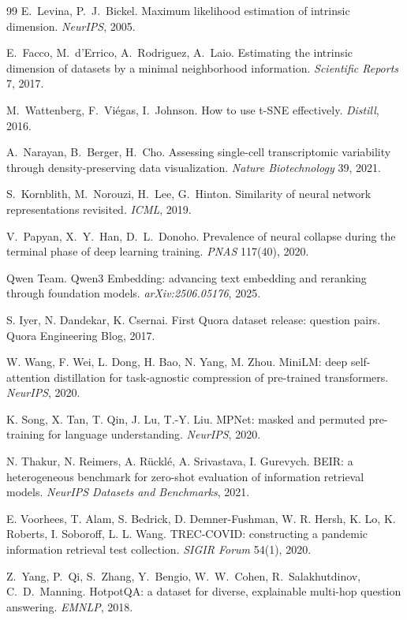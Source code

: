 \documentclass[11pt,letterpaper]{article}
\begin{document}
\begin{thebibliography}{99}
 E.~Levina, P.~J.~Bickel. Maximum likelihood estimation
of intrinsic dimension. \emph{NeurIPS}, 2005.

 E.~Facco, M.~d'Errico, A.~Rodriguez, A.~Laio. Estimating
the intrinsic dimension of datasets by a minimal neighborhood information.
\emph{Scientific Reports} 7, 2017.

 M.~Wattenberg, F.~Vi\'egas, I.~Johnson. How to use
t-SNE effectively. \emph{Distill}, 2016.

 A.~Narayan, B.~Berger, H.~Cho. Assessing single-cell
transcriptomic variability through density-preserving data visualization.
\emph{Nature Biotechnology} 39, 2021.

 S.~Kornblith, M.~Norouzi, H.~Lee, G.~Hinton.
Similarity of neural network representations revisited. \emph{ICML}, 2019.

 V.~Papyan, X.~Y.~Han, D.~L.~Donoho. Prevalence of
neural collapse during the terminal phase of deep learning training.
\emph{PNAS} 117(40), 2020.

 Qwen Team. Qwen3 Embedding: advancing text
embedding and reranking through foundation models.
\emph{arXiv:2506.05176}, 2025.

 S. Iyer, N. Dandekar, K. Csernai. First Quora dataset
release: question pairs. Quora Engineering Blog, 2017.

 W. Wang, F. Wei, L. Dong, H. Bao, N. Yang,
M. Zhou. MiniLM: deep self-attention distillation for task-agnostic
compression of pre-trained transformers. \emph{NeurIPS}, 2020.

 K. Song, X. Tan, T. Qin, J. Lu, T.-Y. Liu. MPNet:
masked and permuted pre-training for language understanding.
\emph{NeurIPS}, 2020.

 N. Thakur, N. Reimers, A. R\"uckl\'e, A. Srivastava,
I. Gurevych. BEIR: a heterogeneous benchmark for zero-shot evaluation of
information retrieval models. \emph{NeurIPS Datasets and Benchmarks}, 2021.

 E. Voorhees, T. Alam, S. Bedrick, D. Demner-Fushman,
W. R. Hersh, K. Lo, K. Roberts, I. Soboroff, L. L. Wang. TREC-COVID:
constructing a pandemic information retrieval test collection. \emph{SIGIR
Forum} 54(1), 2020.

 Z.~Yang, P.~Qi, S.~Zhang, Y.~Bengio, W.~W.~Cohen,
R.~Salakhutdinov, C.~D.~Manning. HotpotQA: a dataset for diverse,
explainable multi-hop question answering. \emph{EMNLP}, 2018.


\end{thebibliography}
\end{document}
